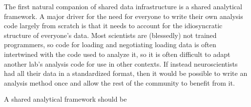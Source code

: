 \documentclass[11pt]{article}
\begin{document}
\begin{multicols}{2}
The first natural companion of shared data infrastructure is a shared
analytical framework. A major driver for the need for everyone to write
their own analysis code largely from scratch is that it needs to account
for the idiosyncratic structure of everyone's data. Most scientists are
(blessedly) not trained programmers, so code for loading and negotiating
loading data is often intertwined with the code used to analyze it, so
it is often difficult to adapt another lab's analysis code for use in
other contexts. If instead neuroscientists had all their data in a
standardized format, then it would be possible to write an analysis
method once and allow the rest of the community to benefit from it.

A shared analytical framework should be

\begin{itemize}


\end{itemize}
\end{multicols}
\end{document}
